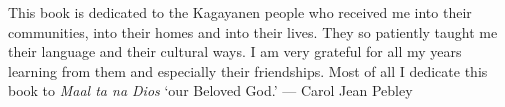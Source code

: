 
This book is dedicated to the Kagayanen people who received me into their communities, into their homes and into their lives. They so patiently taught me their language and their cultural ways. I am very grateful for all my years learning from them and especially their friendships. Most of all I dedicate this book to \emph{Maal ta na Dios} ‘our Beloved God.’ --- Carol Jean Pebley
